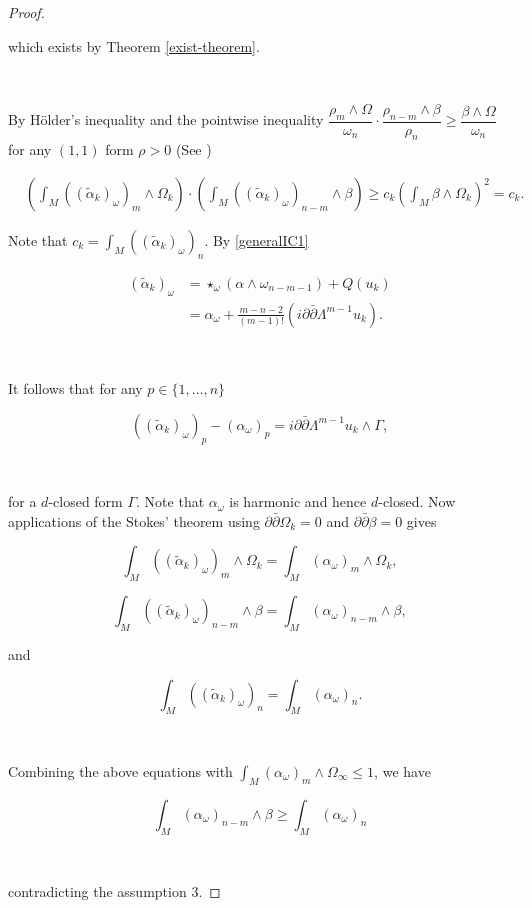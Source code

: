 \documentclass[10pt,a4paper]{amsart}
\newcommand{\pbp}{\partial \bar{\partial}}
\numberwithin{equation}{section}
\begin{document}
\begin{proof}
  \

  \noindent which exists by Theorem \ref{exist-theorem}.

  \

  By H\"older's inequality and the pointwise inequality $\dfrac{\rho_m \wedge \Omega}{\omega_n} \cdot \dfrac{\rho_{n-m} \wedge \beta}{\rho_n} \geq \dfrac{\beta \wedge \Omega}{\omega_n}$ for any $(1,1)$ form $\rho>0$ (See \cite[p.~25]{DP25})

$$\begin{aligned}
&\left( \int_M ((\tilde{\alpha}_k)_\omega)_m \wedge \Omega_k \right) \cdot \left( \int_M ((\tilde{\alpha}_k)_\omega)_{n-m} \wedge \beta \right) \geq c_k \left( \int_M \beta \wedge \Omega_k \right)^2 = c_k.
\end{aligned}$$


Note that $c_k = \int_M ((\tilde{\alpha}_k)_\omega)_n $. By \eqref{generalIC1}

$$\begin{aligned}
(\tilde{\alpha}_k)_\omega &= \star_{\omega}\left(\alpha \wedge \omega_{n-m-1}\right) + Q(u_k) \\
&= \alpha_\omega  + \frac{m-n-2}{(m-1)!}\left( i \pbp \Lambda^{m-1}  u_k \right).
\end{aligned}$$

\

It follows that for any $p \in \{1,\hdots, n\}$

$$((\tilde{\alpha}_k)_\omega)_p - (\alpha_\omega)_p = i\pbp \Lambda^{m-1} u_k \wedge \Gamma ,$$

\

\noindent for a $d$-closed form $\Gamma$. Note that $\alpha_{\omega}$ is harmonic and hence $d$-closed. Now applications of the Stokes' theorem using $\pbp \Omega_k=0$ and $\pbp \beta = 0$ gives

$$ \int_M ((\tilde{\alpha}_k)_\omega)_m \wedge \Omega_k = \int_M (\alpha_\omega)_m \wedge \Omega_k,$$

$$ \int_M ((\tilde{\alpha}_k)_\omega)_{n-m} \wedge \beta =  \int_M (\alpha_\omega)_{n-m} \wedge \beta , $$


\noindent and

$$\int_M ((\tilde{\alpha}_k)_\omega)_n =\int_M ({\alpha}_\omega)_n .$$


\

Combining the above equations with $\int_{M} (\alpha_{\omega})_{m} \wedge \Omega_{\infty} \leq 1$, we have


$$\int_{M} (\alpha_{\omega})_{n-m} \wedge \beta \geq \int_{M} (\alpha_{\omega})_{n}$$

\

\noindent contradicting the assumption $3$.



\end{proof}
\end{document}
